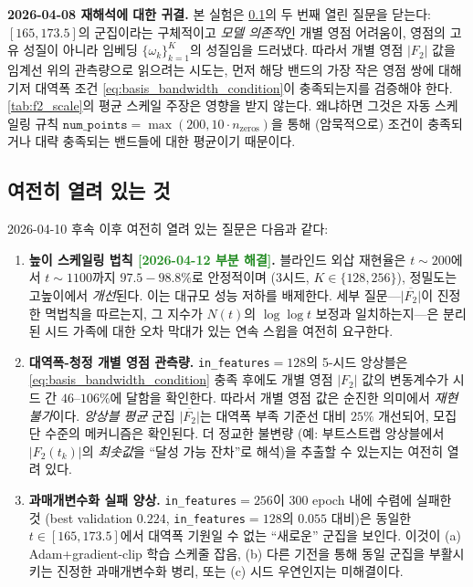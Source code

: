 \documentclass[11pt, a4paper]{article}
\theoremstyle{definition}
\theoremstyle{plain}
\begin{document}
\smallskip
\noindent\textbf{2026-04-08 재해석에 대한 귀결.} 본 실험은 \cref{sec:f2_residual_open}의 두 번째 열린 질문을 닫는다: $[165,173.5]$의 군집이라는 구체적이고 \emph{모델 의존적}인 개별 영점 어려움이, 영점의 고유 성질이 아니라 임베딩 $\{\omega_k\}_{k=1}^{K}$의 성질임을 드러냈다. 따라서 개별 영점 $|F_2|$ 값을 임계선 위의 관측량으로 읽으려는 시도는, 먼저 해당 밴드의 가장 작은 영점 쌍에 대해 기저 대역폭 조건 \eqref{eq:basis_bandwidth_condition}이 충족되는지를 검증해야 한다. \cref{tab:f2_scale}의 평균 스케일 주장은 영향을 받지 않는다. 왜냐하면 그것은 자동 스케일링 규칙 $\texttt{num\_points}=\max(200,10\cdot n_{\mathrm{zeros}})$을 통해 (암묵적으로) 조건이 충족되거나 대략 충족되는 밴드들에 대한 평균이기 때문이다.

\subsection{여전히 열려 있는 것}
\label{sec:f2_residual_open}

2026-04-10 후속 이후 여전히 열려 있는 질문은 다음과 같다:
\begin{enumerate}
  \item \textbf{높이 스케일링 법칙
        \textcolor{ForestGreen}{[2026-04-12 부분 해결]}.}
        블라인드 외삽 재현율은 $t{\sim}200$에서 $t{\sim}1100$까지
        $97.5{-}98.8\%$로 안정적이며 (3시드, $K\in\{128,256\}$),
        정밀도는 고높이에서 \emph{개선}된다. 이는 대규모 성능 저하를
        배제한다. 세부 질문---$\overline{|F_2|}$이 진정한 멱법칙을
        따르는지, 그 지수가 $N(t)$의 $\log\log t$ 보정과
        일치하는지---은 분리된 시드 가족에 대한 오차 막대가 있는
        연속 스윕을 여전히 요구한다.
  \item \textbf{대역폭-청정 개별 영점 관측량.} \texttt{in\_features}$=128$의 5-시드 앙상블은 \eqref{eq:basis_bandwidth_condition} 충족 후에도 개별 영점 $|F_2|$ 값의 변동계수가 시드 간 $46$--$106\%$에 달함을 확인한다. 따라서 개별 영점 값은 순진한 의미에서 \emph{재현 불가}이다. \emph{앙상블 평균} 군집 $\overline{|F_2|}$는 대역폭 부족 기준선 대비 $25\%$ 개선되어, 모집단 수준의 메커니즘은 확인된다. 더 정교한 불변량 (예: 부트스트랩 앙상블에서 $|F_2(t_k)|$의 \emph{최솟값}을 ``달성 가능 잔차''로 해석)을 추출할 수 있는지는 여전히 열려 있다.
  \item \textbf{과매개변수화 실패 양상.} \texttt{in\_features}$=256$이 $300$ epoch 내에 수렴에 실패한 것 (best validation $0.224$, \texttt{in\_features}$=128$의 $0.055$ 대비)은 동일한 $t\in[165,173.5]$에서 대역폭 기원일 수 없는 ``새로운'' 군집을 보인다. 이것이 (a) Adam+gradient-clip 학습 스케줄 잡음, (b) 다른 기전을 통해 동일 군집을 부활시키는 진정한 과매개변수화 병리, 또는 (c) 시드 우연인지는 미해결이다.
\end{enumerate}
\end{document}
